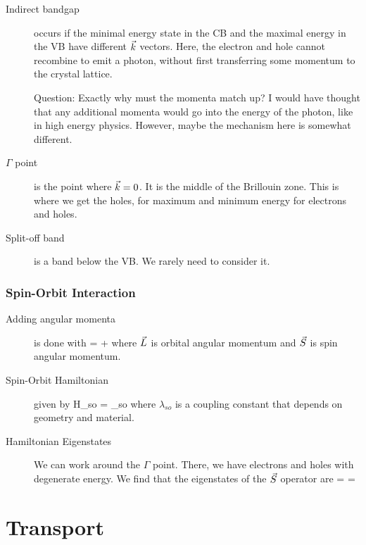 \begin{description}
\item[Indirect bandgap] occurs if the minimal energy state in the CB and the maximal energy in the VB have different $\vec{k}$ vectors. Here, the electron and hole cannot recombine to emit a photon, without first transferring some momentum to the crystal lattice. 

Question: Exactly why must the momenta match up? I would have thought that any additional momenta would go into the energy of the photon, like in high energy physics. However, maybe the mechanism here is somewhat different. 

\item[$\Gamma $ point] is the point where $\vec{k} = 0$. It is the middle of the Brillouin zone. This is where we get the holes, for maximum and minimum energy for electrons and holes. 


\item[Split-off band] is a band below the VB. We rarely need to consider it. 

\end{description}
\subsubsection{Spin-Orbit Interaction}
\begin{description}
\item[Adding angular momenta] is done with 
\beq
{} =  + 
\eeq
where $\vec{L}$ is orbital angular momentum and  $\vec{S}$ is spin angular momentum. 

\item[Spin-Orbit Hamiltonian] given by 
\beq
H_{so} = \lambda_{so}  \cdot {}
\eeq
where $\lambda_{so}$ is a coupling constant that depends on geometry and material. 

\item[Hamiltonian Eigenstates] We can work around the $\Gamma$ point. There, we have electrons and holes with degenerate energy. We find that the eigenstates of the $\vec{S}$ operator are
\beq
{} = \ket{\uparrow}
\eeq
\beq
{} = \ket{\uparrow}
\eeq



\end{description}


\section{Transport}

